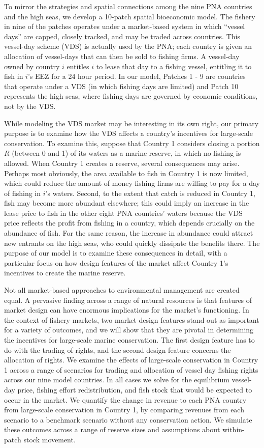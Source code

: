 \documentclass[12pt]{article}
\begin{document}
To mirror the strategies and spatial connections among the nine PNA countries and the high seas, we develop a 10-patch spatial bioeconomic model. The fishery in nine of the patches operates under a market-based system in which ``vessel days'' are capped, closely tracked, and may be traded across countries.  This vessel-day scheme (VDS) is actually used by the PNA; each country is given an allocation of vessel-days that can then be sold to fishing firms. A vessel-day owned by country $i$ entitles $i$ to lease that day to a fishing vessel, entitling it to fish in $i$'s EEZ for a 24 hour period. In our model, Patches 1 - 9 are countries that operate under a VDS (in which fishing days are limited) and Patch 10 represents the high seas, where fishing days are governed by economic conditions, not by the VDS.

While modeling the VDS market may be interesting in its own right, our primary purpose is to examine how the VDS affects a country's incentives for large-scale conservation. To examine this, suppose that Country 1 considers closing a portion $R$ (between 0 and 1) of its waters as a marine reserve, in which no fishing is allowed. When Country 1 creates a reserve, several consequences may arise.  Perhaps most obviously, the area available to fish in Country 1 is now limited, which could reduce the amount of money fishing firms are willing to pay for a day of fishing in $i$'s waters.  Second, to the extent that catch is reduced in Country 1, fish may become more abundant elsewhere; this could imply an increase in the lease price to fish in the other eight PNA countries' waters because the VDS price reflects the profit from fishing in a country, which depends crucially on the abundance of fish. For the same reason, the increase in abundance could attract new entrants on the high seas, who could quickly dissipate the benefits there. The purpose of our model is to examine these consequences in detail, with a particular focus on how design features of the market affect Country 1's incentives to create the marine reserve.

Not all market-based approaches to environmental management are created equal. A pervasive finding across a range of natural resources is that features of market design can have enormous implications for the market's functioning. In the context of fishery markets, two market design features stand out as important for a variety of outcomes, and we will show that they are pivotal in determining the incentives for large-scale marine conservation. The first design feature has to do with the trading of rights, and the second design feature concerns the allocation of rights. We examine the effects of large-scale conservation in Country 1 across a range of scenarios for trading and allocation of vessel day fishing rights across our nine model countries. In all cases we solve for the equilibrium vessel-day price, fishing effort redistribution, and fish stock that would be expected to occur in the market. We quantify the change in revenue to each PNA country from large-scale conservation in Country 1, by comparing revenues from each scenario to a benchmark scenario without any conservation action. We simulate these outcomes across a range of reserve sizes and assumptions about within-patch stock movement.
\end{document}
